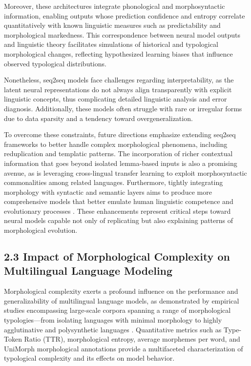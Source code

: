 \documentclass[11pt]{article}
\begin{document}
Moreover, these architectures integrate phonological and morphosyntactic information, enabling outputs whose prediction confidence and entropy correlate quantitatively with known linguistic measures such as predictability and morphological markedness. This correspondence between neural model outputs and linguistic theory facilitates simulations of historical and typological morphological changes, reflecting hypothesized learning biases that influence observed typological distributions.

Nonetheless, seq2seq models face challenges regarding interpretability, as the latent neural representations do not always align transparently with explicit linguistic concepts, thus complicating detailed linguistic analysis and error diagnosis. Additionally, these models often struggle with rare or irregular forms due to data sparsity and a tendency toward overgeneralization. 

To overcome these constraints, future directions emphasize extending seq2seq frameworks to better handle complex morphological phenomena, including reduplication and templatic patterns. The incorporation of richer contextual information that goes beyond isolated lemma-based inputs is also a promising avenue, as is leveraging cross-lingual transfer learning to exploit morphosyntactic commonalities among related languages. Furthermore, tightly integrating morphology with syntactic and semantic layers aims to produce more comprehensive models that better emulate human linguistic competence and evolutionary processes \cite{ref42}. These enhancements represent critical steps toward neural models capable not only of replicating but also explaining patterns of morphological evolution.

\subsection{2.3 Impact of Morphological Complexity on Multilingual Language Modeling}

Morphological complexity exerts a profound influence on the performance and generalizability of multilingual language models, as demonstrated by empirical studies encompassing large-scale corpora spanning a range of morphological typologies—from isolating languages with minimal morphology to highly agglutinative and polysynthetic languages \cite{ref34}. Quantitative metrics such as Type-Token Ratio (TTR), morphological entropy, average morphemes per word, and UniMorph morphological annotations provide a multifaceted characterization of typological complexity and its effects on model behavior.
\end{document}
